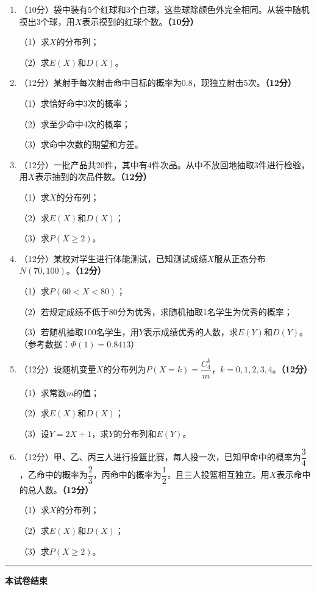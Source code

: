\documentclass[12pt, a4paper]{ctexart}
\newcommand{\score}[1]{\hfill\textbf{（#1分）}}
\begin{document}
\begin{enumerate}[label=\textbf{\arabic*.}, leftmargin=2em, resume]

\item（10分）袋中装有5个红球和3个白球，这些球除颜色外完全相同。从袋中随机摸出3个球，用$X$表示摸到的红球个数。\score{10}

（1）求$X$的分布列；

（2）求$E(X)$和$D(X)$。

\item（12分）某射手每次射击命中目标的概率为$0.8$，现独立射击5次。\score{12}

（1）求恰好命中3次的概率；

（2）求至少命中4次的概率；

（3）求命中次数的期望和方差。

\item（12分）一批产品共20件，其中有4件次品。从中不放回地抽取3件进行检验，用$X$表示抽到的次品件数。\score{12}

（1）求$X$的分布列；

（2）求$E(X)$和$D(X)$；

（3）求$P(X \geqslant 2)$。

\item（12分）某校对学生进行体能测试，已知测试成绩$X$服从正态分布$N(70, 100)$。\score{12}

（1）求$P(60 < X < 80)$；

（2）若规定成绩不低于80分为优秀，求随机抽取1名学生为优秀的概率；

（3）若随机抽取100名学生，用$Y$表示成绩优秀的人数，求$E(Y)$和$D(Y)$。（参考数据：$\Phi(1) = 0.8413$）

\item（12分）设随机变量$X$的分布列为$P(X=k) = \dfrac{C_4^k}{m}$，$k=0,1,2,3,4$。\score{12}

（1）求常数$m$的值；

（2）求$E(X)$和$D(X)$；

（3）设$Y = 2X+1$，求$Y$的分布列和$E(Y)$。

\item（12分）甲、乙、丙三人进行投篮比赛，每人投一次，已知甲命中的概率为$\dfrac{3}{4}$，乙命中的概率为$\dfrac{2}{3}$，丙命中的概率为$\dfrac{1}{2}$，且三人投篮相互独立。用$X$表示命中的总人数。\score{12}

（1）求$X$的分布列；

（2）求$E(X)$和$D(X)$；

（3）求$P(X \geqslant 2)$。

\end{enumerate}

\vspace{1cm}
\begin{center}
\rule{8cm}{0.4pt}

\vspace{0.3cm}
\textbf{本试卷结束}
\end{center}
\end{document}
